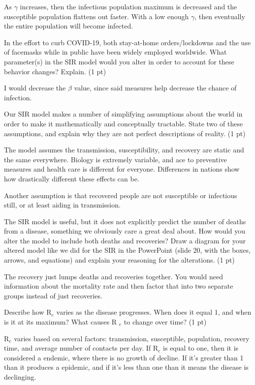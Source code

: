 \documentclass[12pt,a4paper]{article}
\begin{document}
\begin{enumerate}[font=\bfseries, wide]
    As $\gamma$ increases, then the infectious population maximum is decreased and the susceptible population flattens out faster. With a low enough $\gamma$, then eventually the entire population will become infected.

    {\color{under}\item  In the effort to curb COVID-19, both stay-at-home orders/lockdowns and the use of facemasks while in public have been widely employed worldwide. What parameter(s) in the SIR model would you alter in order to account for these behavior changes? Explain. (1 pt)}
    
    I would decrease the $\beta$ value, since said measures help decrease the chance of infection.

    {\color{under}\item Our SIR model makes a number of simplifying assumptions about the world in order to make it mathematically and conceptually tractable. State two of these assumptions, and explain why they are not perfect descriptions of reality. (1 pt)}
    
    The model assumes the transmission, susceptibility, and recovery are static and the same everywhere. Biology is extremely variable, and ace to preventive measures and health care is different for everyone. Differences in nations show how drastically different these effects can be.

    Another assumption is that recovered people are not susceptible or infectious still, or at least aiding in transmission.

    {\color{under}\item The SIR model is useful, but it does not explicitly predict the number of deaths from a disease, something we obviously care a great deal about. How would you alter the model to include both deaths and recoveries? Draw a diagram for your altered model like we did for the SIR in the PowerPoint (slide 20, with the boxes, arrows, and equations) and explain your reasoning for the alterations. (1 pt)}
    
    The recovery just lumps deaths and recoveries together. You would need information about the mortality rate and then factor that into two separate groups instead of just recoveries.

    {\color{under}\item  Describe how R$_e$ varies as the disease progresses. When does it equal 1, and when is it at its maximum? What causes R $_e$ to change over time? (1 pt)}
    
    R$_e$ varies based on several factors: transmission, susceptible, population, recovery time, and average number of contacts per day. If R$_e$ is equal to one, then it is considered a endemic, where there is no growth of decline. If it's greater than 1 than it produces a epidemic, and if it's less than one than it means the disease is declinging.
    
\end{enumerate}
\newpage
\end{document}
